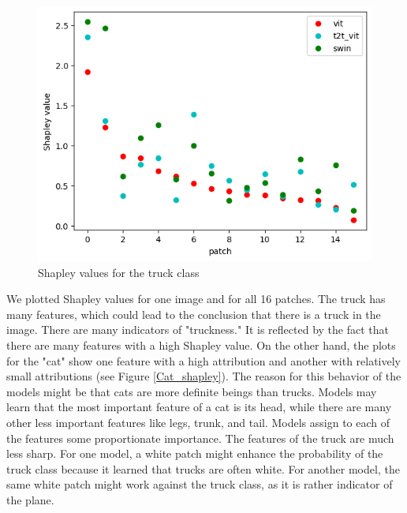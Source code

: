 \documentclass[en]{pracamgr}
\begin{document}
\begin{figure}[H]
\centering
\includegraphics[scale=0.5]{./images/Truck_shapley.png}
\caption{Shapley values for the truck class}
\label{Truck_shapley}
\end{figure}

We plotted Shapley values for one image and for all 16 patches. The truck has many features, which could lead to the conclusion that there is a truck in the image. There are many indicators of "truckness." It is reflected by the fact that there are many features with a high Shapley value. On the other hand, the plots for the "cat" show one feature with a high attribution and another with relatively small attributions (see Figure \ref{Cat_shapley}). The reason for this behavior of the models might be that cats are more definite beings than trucks. Models may learn that the most important feature of a cat is its head, while there are many other less important features like legs, trunk, and tail. Models assign to each of the features some proportionate importance. The features of the truck are much less sharp. For one model, a white patch might enhance the probability of the truck class because it learned that trucks are often white. For another model, the same white patch might work against the truck class, as it is rather indicator of the plane.
\end{document}

